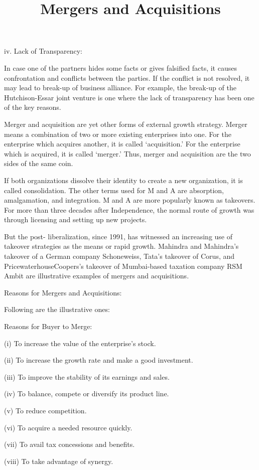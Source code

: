 \documentclass{article}
\begin{document}
iv. Lack of Transparency:

In case one of the partners hides some facts or gives falsified facts, it causes confrontation and conflicts between the parties. 
If the conflict is not resolved, it may lead to break-up of business alliance. For example, the break-up of the Hutchison-Essar joint venture is one where the lack of transparency has been one of the key reasons. 

\title{Mergers and Acquisitions}
Merger and acquisition are yet other forms of external growth strategy. Merger means a combination of two or more existing
 enterprises into one. For the enterprise which acquires another, it is called ‘acquisition.’ For the enterprise which is acquired, it is called ‘merger.’ Thus, merger and acquisition are the two sides of the same coin.

If both organizations dissolve their identity to create a new organization, it is called consolidation. The other terms 
used for M and A are absorption, amalgamation, and integration. M and A are more popularly known as takeovers. For more than three decades after Independence, the normal route of growth was through licensing and setting up new projects.

But the post- liberalization, since 1991, has witnessed an increasing use of takeover strategies as the means or rapid growth.
 Mahindra  and  Mahindra’s takeover of a German company Schoneweiss, Tata’s takeover of Corus, and PricewaterhouseCoopers’s
  takeover of Mumbai-based taxation company RSM Ambit are illustrative examples of mergers  and  acquisitions.

Reasons for Mergers and Acquisitions:

Following are the illustrative ones:

Reasons for Buyer to Merge:

(i) To increase the value of the enterprise’s stock.

(ii) To increase the growth rate and make a good investment.

(iii) To improve the stability of its earnings and sales.

(iv) To balance, compete or diversify its product line.

(v) To reduce competition.

(vi) To acquire a needed resource quickly.

(vii) To avail tax concessions and benefits.

(viii) To take advantage of synergy.
\end{document}
